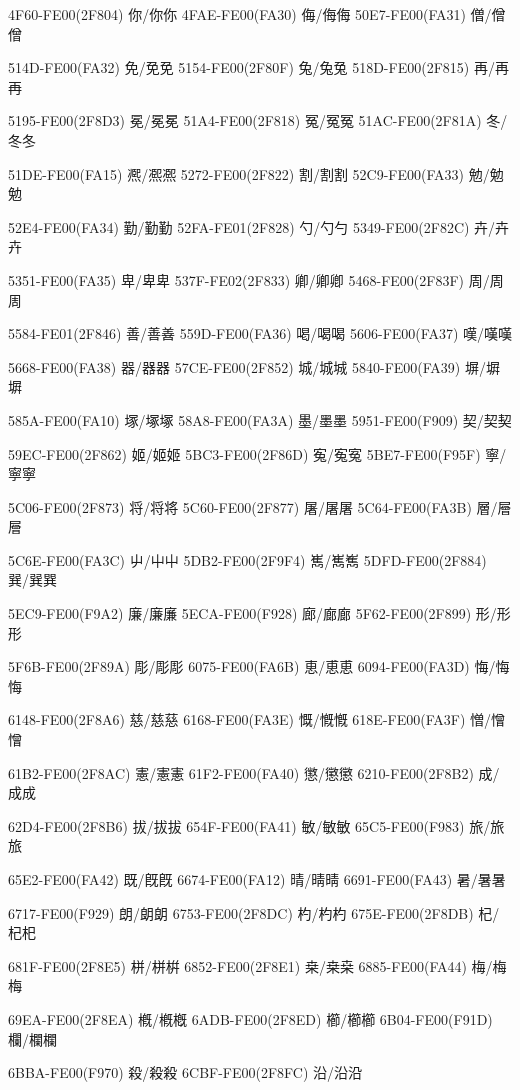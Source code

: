 4F60-FE00(2F804) 你/你︀你 
4FAE-FE00(FA30) 侮/侮︀侮 
50E7-FE00(FA31) 僧/僧︀僧\par
514D-FE00(FA32) 免/免︀免 
5154-FE00(2F80F) 兔/兔︀兔 
518D-FE00(2F815) 再/再︀再\par
5195-FE00(2F8D3) 冕/冕︀冕 
51A4-FE00(2F818) 冤/冤︀冤 
51AC-FE00(2F81A) 冬/冬︀冬\par
51DE-FE00(FA15) 凞/凞︀凞 
5272-FE00(2F822) 割/割︀割 
52C9-FE00(FA33) 勉/勉︀勉\par
52E4-FE00(FA34) 勤/勤︀勤 
52FA-FE01(2F828) 勺/勺︁勺 
5349-FE00(2F82C) 卉/卉︀卉\par
5351-FE00(FA35) 卑/卑︀卑 
537F-FE02(2F833) 卿/卿︂卿 
5468-FE00(2F83F) 周/周︀周\par
5584-FE01(2F846) 善/善︁善 
559D-FE00(FA36) 喝/喝︀喝 
5606-FE00(FA37) 嘆/嘆︀嘆\par
5668-FE00(FA38) 器/器︀器 
57CE-FE00(2F852) 城/城︀城 
5840-FE00(FA39) 塀/塀︀塀\par
585A-FE00(FA10) 塚/塚︀塚 
58A8-FE00(FA3A) 墨/墨︀墨 
5951-FE00(F909) 契/契︀契\par
59EC-FE00(2F862) 姬/姬︀姬 
5BC3-FE00(2F86D) 寃/寃︀寃 
5BE7-FE00(F95F) 寧/寧︀寧\par
5C06-FE00(2F873) 将/将︀将 
5C60-FE00(2F877) 屠/屠︀屠 
5C64-FE00(FA3B) 層/層︀層\par
5C6E-FE00(FA3C) 屮/屮︀屮 
5DB2-FE00(2F9F4) 嶲/嶲︀嶲 
5DFD-FE00(2F884) 巽/巽︀巽\par
5EC9-FE00(F9A2) 廉/廉︀廉 
5ECA-FE00(F928) 廊/廊︀廊 
5F62-FE00(2F899) 形/形︀形\par
5F6B-FE00(2F89A) 彫/彫︀彫 
6075-FE00(FA6B) 恵/恵︀恵 
6094-FE00(FA3D) 悔/悔︀悔\par
6148-FE00(2F8A6) 慈/慈︀慈 
6168-FE00(FA3E) 慨/慨︀慨 
618E-FE00(FA3F) 憎/憎︀憎\par
61B2-FE00(2F8AC) 憲/憲︀憲 
61F2-FE00(FA40) 懲/懲︀懲 
6210-FE00(2F8B2) 成/成︀成\par
62D4-FE00(2F8B6) 拔/拔︀拔 
654F-FE00(FA41) 敏/敏︀敏 
65C5-FE00(F983) 旅/旅︀旅\par
65E2-FE00(FA42) 既/既︀既 
6674-FE00(FA12) 晴/晴︀晴 
6691-FE00(FA43) 暑/暑︀暑\par
6717-FE00(F929) 朗/朗︀朗 
6753-FE00(2F8DC) 杓/杓︀杓 
675E-FE00(2F8DB) 杞/杞︀杞\par
681F-FE00(2F8E5) 栟/栟︀栟 
6852-FE00(2F8E1) 桒/桒︀桒 
6885-FE00(FA44) 梅/梅︀梅\par
69EA-FE00(2F8EA) 槪/槪︀槪 
6ADB-FE00(2F8ED) 櫛/櫛︀櫛 
6B04-FE00(F91D) 欄/欄︀欄\par
6BBA-FE00(F970) 殺/殺︀殺 
6CBF-FE00(2F8FC) 沿/沿︀沿 
